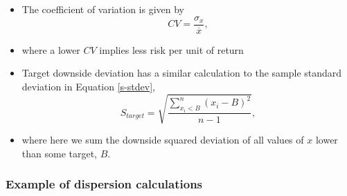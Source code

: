 \documentclass[../notes_compiled.tex]{subfiles}
\begin{document}
\begin{itemize}
\item The coefficient of variation is given by
\begin{equation}
CV= \frac{\sigma_{x}}{\overline{x}},
\end{equation}
\item[] where a lower $CV$ implies less risk per unit of return
\item Target downside deviation has a similar calculation to the sample standard deviation in Equation \ref{s-stdev}, 
\begin{equation}
S_{target} = \sqrt{\frac{\sum_{x_{i}< B}^{n}\left(x_{i}-B\right)^{2}}{n-1}},
\end{equation}
\item[] where here we sum the downside squared deviation of all values of $x$ lower than some target, $B$.
\end{itemize}

\subsubsection{Example of dispersion calculations}
\end{document}
